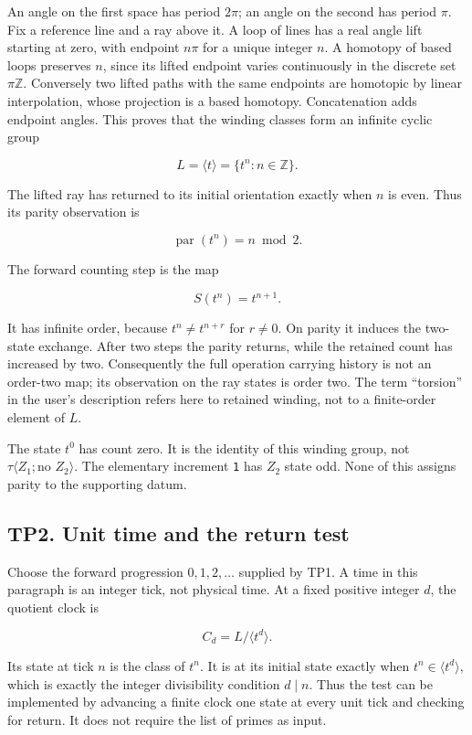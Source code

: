\documentclass[
]{article}
\begin{document}
An angle on the first space has period \(2\pi\); an angle on the second
has period \(\pi\). Fix a reference line and a ray above it. A loop of
lines has a real angle lift starting at zero, with endpoint \(n\pi\) for
a unique integer \(n\). A homotopy of based loops preserves \(n\), since
its lifted endpoint varies continuously in the discrete set
\(\pi\mathbb Z\). Conversely two lifted paths with the same endpoints
are homotopic by linear interpolation, whose projection is a based
homotopy. Concatenation adds endpoint angles. This proves that the
winding classes form an infinite cyclic group

\[
L=\langle t\rangle=\{t^n:n\in\mathbb Z\}.
\]

The lifted ray has returned to its initial orientation exactly when
\(n\) is even. Thus its parity observation is

\[
\operatorname{par}(t^n)=n\bmod 2.
\]

The forward counting step is the map

\[
S(t^n)=t^{n+1}.
\]

It has infinite order, because \(t^n\ne t^{n+r}\) for \(r\ne0\). On
parity it induces the two-state exchange. After two steps the parity
returns, while the retained count has increased by two. Consequently the
full operation carrying history is not an order-two map; its observation
on the ray states is order two. The term ``torsion'' in the user's
description refers here to retained winding, not to a finite-order
element of \(L\).

The state \(t^0\) has count zero. It is the identity of this winding
group, not \(\tau\langle Z_1;\text{no }Z_2\rangle\). The elementary
increment \texttt{1} has \(Z_2\) state odd. None of this assigns parity
to the supporting datum.

\subsection{TP2. Unit time and the return
test}\label{tp2.-unit-time-and-the-return-test}

Choose the forward progression \(0,1,2,\ldots\) supplied by TP1. A time
in this paragraph is an integer tick, not physical time. At a fixed
positive integer \(d\), the quotient clock is

\[
C_d=L/\langle t^d\rangle.
\]

Its state at tick \(n\) is the class of \(t^n\). It is at its initial
state exactly when \(t^n\in\langle t^d\rangle\), which is exactly the
integer divisibility condition \(d\mid n\). Thus the test can be
implemented by advancing a finite clock one state at every unit tick and
checking for return. It does not require the list of primes as input.
\end{document}
